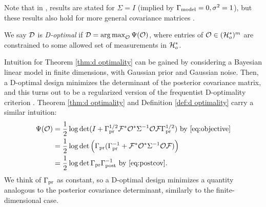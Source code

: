 Note that in \cite{AlexanderianGloorGhattas14,
  alexanderian2018efficient}, results are stated for \(\Sigma=I\)
(implied by \(\Gamma_{\textup{model}} = 0,\sigma^2=1\)), but these results also hold
for more general covariance matrices
\cite[p. 681]{AlexanderianGloorGhattas14}.

\begin{definition}\label{def:d optimality}
  We say \(\mathcal{D}\) is \emph{D-optimal} if \(\mathcal{D} =
  \operatorname*{arg\,max}_{\mathcal{O}} \Psi(\mathcal{O})\), where entries of \(\mathcal{O} \in (\mathcal{H}_o^*)^m\)
  are constrained to some allowed set of measurements in \(\mathcal{H}_o^*\).
\end{definition}

Intuition for Theorem \ref{thm:d optimality} can be gained by
considering a Bayesian linear model in finite dimensions, with
Gaussian prior and Gaussian noise. Then, a D-optimal design minimizes
the determinant of the posterior covariance matrix, and this turns out
to be a regularized version of the frequentist D-optimality criterion
\cite{Chaloner1995}. Theorem \ref{thm:d optimality} and Definition
\ref{def:d optimality} carry a similar intuition:
\begin{align*}
  \begin{split}
    \tar(\obs) &= \frac12 \log \det ( I + \prcov^{1/2}  \fwd ^* \obs^* \Sigma^{-1} \obs \fwd \prcov^{1/2}) \text{ by \eqref{eq:objective}}\\
    &= \frac12 \log \det \Big( \prcov ( \prcov^{-1} + \fwd ^* \obs^* \Sigma^{-1} \obs \fwd) \Big )\\
    &= \frac12 \log \det \prcov \postcov^{-1} \text{ by \eqref{eq:postcov}}.
  \end{split}
\end{align*}
We think of \(\Gamma_{\textup{pr}}\) as constant, so a D-optimal design minimizes a
quantity analogous to the posterior covariance determinant, similarly
to the finite-dimensional case.


